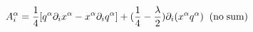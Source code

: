 \begin{equation}
\label{gaugepot}
A^{\alpha}_i=\frac{1}{4}[q^{\alpha}\partial_ix^{\alpha}-x^{\alpha}\partial_iq^{\alpha}]+(\frac{1}{4}-\frac{\lambda}{2})\partial_i(x^{\alpha}q^{\alpha})\;\;{\rm (no\;sum)}
\end{equation}

